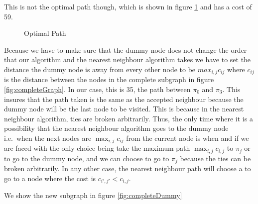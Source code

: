 This is not the optimal path though, which is shown in figure \ref{fig:optcompleteGraph} and has a cost of 59.

\begin{figure}
\centering
{}
\caption{Optimal Path}
\label{fig:optcompleteGraph}
\end{figure}


Because we have to make sure that the dummy node does not change the order that our algorithm and the nearest neighbour algorithm takes we have to set the distance the dummy node is away from every other node to be $max_{i,j} c_{ij} $ where $c_{ij}$ is the distance between the nodes in the complete subgraph in figure \ref{fig:completeGraph}. In our case, this is 35, the path between $\pi_0$ and $\pi_3$. This insures that the path taken is the same as the accepted neighbour because the dummy node will be the last node to be visited. This is because in the nearest neighbour algorithm, ties are broken arbitrarily. Thus, the only time where it is a possibility that the nearest neighbour algorithm goes to the dummy node i.e.\ when the next nodes are $\max_{i,j} c_{ij}$ from the current node is when and if we are faced with the only choice being take the maximum path $\max_{i,j} c_{i,j}$ to $\pi_j$ or to go to the dummy node, and we can choose to go to $\pi_j$ because the ties can be broken arbitrarily. In any other case, the nearest neighbour path will choose a to go to a node where the cost is $c_{i',j'} < c_{i,j}$. 

We show the new subgraph in figure \ref{fig:completeDummy}

